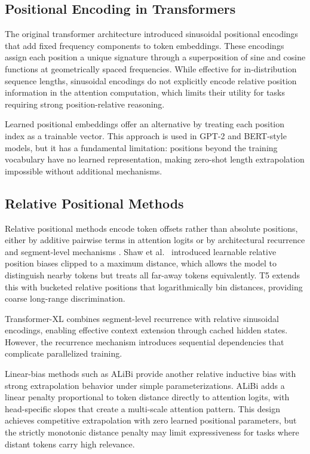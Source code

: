 \documentclass[conference]{IEEEtran}
\begin{document}
\subsection{Positional Encoding in Transformers}
The original transformer architecture \cite{vaswani2017attention} introduced sinusoidal positional encodings that add fixed frequency components to token embeddings. These encodings assign each position a unique signature through a superposition of sine and cosine functions at geometrically spaced frequencies. While effective for in-distribution sequence lengths, sinusoidal encodings do not explicitly encode relative position information in the attention computation, which limits their utility for tasks requiring strong position-relative reasoning.

Learned positional embeddings offer an alternative by treating each position index as a trainable vector. This approach is used in GPT-2 and BERT-style models, but it has a fundamental limitation: positions beyond the training vocabulary have no learned representation, making zero-shot length extrapolation impossible without additional mechanisms.

\subsection{Relative Positional Methods}
Relative positional methods encode token offsets rather than absolute positions, either by additive pairwise terms in attention logits \cite{shaw2018self,raffel2020t5} or by architectural recurrence and segment-level mechanisms \cite{dai2019transformerxl}. Shaw et al.\ \cite{shaw2018self} introduced learnable relative position biases clipped to a maximum distance, which allows the model to distinguish nearby tokens but treats all far-away tokens equivalently. T5 \cite{raffel2020t5} extends this with bucketed relative positions that logarithmically bin distances, providing coarse long-range discrimination.

Transformer-XL \cite{dai2019transformerxl} combines segment-level recurrence with relative sinusoidal encodings, enabling effective context extension through cached hidden states. However, the recurrence mechanism introduces sequential dependencies that complicate parallelized training.

Linear-bias methods such as ALiBi \cite{press2022alibi} provide another relative inductive bias with strong extrapolation behavior under simple parameterizations. ALiBi adds a linear penalty proportional to token distance directly to attention logits, with head-specific slopes that create a multi-scale attention pattern. This design achieves competitive extrapolation with zero learned positional parameters, but the strictly monotonic distance penalty may limit expressiveness for tasks where distant tokens carry high relevance.
\end{document}
